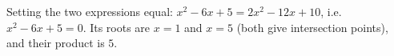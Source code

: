 Setting the two expressions equal: $x^2-6x+5=2x^2-12x+10$, i.e. $x^2-6x+5=0$. Its roots are $x=1$ and $x=5$ (both give intersection points), and their product is $\boxed{5}$.
